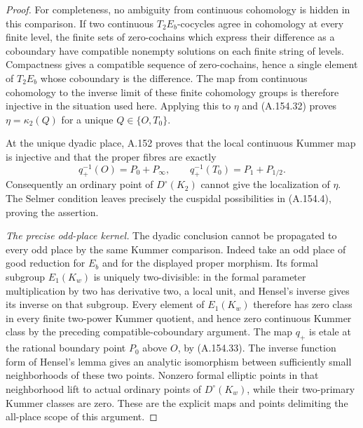 \begin{proof}
For completeness, no ambiguity from continuous
cohomology is hidden in this comparison.  If two
continuous \(T_2E_b\)-cocycles agree in cohomology at
every finite level, the finite sets of zero-cochains
which express their difference as a coboundary have
compatible nonempty solutions on each finite string
of levels.  Compactness gives a compatible sequence
of zero-cochains, hence a single element of \(T_2E_b\)
whose coboundary is the difference.  The map from
continuous cohomology to the inverse limit of these
finite cohomology groups is therefore injective in
the situation used here.  Applying this to \(\eta\)
and (A.154.32) proves
\(\eta=\kappa_2(Q)\) for a unique \(Q\in\{O,T_0\}\).

At the unique dyadic place, A.152 proves that the
local continuous Kummer map is injective and that the
proper fibres are exactly
\[
                  q_+^{-1}(O)=P_0+P_\infty,
             \qquad q_+^{-1}(T_0)=P_1+P_{1/2}.
\tag{A.154.33}
\]
Consequently an ordinary point of \(D^\circ(K_2)\)
cannot give the localization of \(\eta\).
The Selmer condition leaves precisely the cuspidal
possibilities in (A.154.4), proving the assertion.

\emph{The precise odd-place kernel.}
The dyadic conclusion cannot be propagated to every
odd place by the same Kummer comparison.  Indeed take
an odd place of good reduction for \(E_b\) and for the
displayed proper morphism.  Its formal subgroup
\(E_1(K_w)\) is uniquely two-divisible: in the formal
parameter multiplication by two has derivative two,
a local unit, and Hensel's inverse gives its inverse
on that subgroup.  Every element of \(E_1(K_w)\)
therefore has zero class in every finite two-power
Kummer quotient, and hence zero continuous Kummer
class by the preceding compatible-coboundary argument.
The map \(q_+\) is etale at the rational boundary point
\(P_0\) above \(O\), by (A.154.33).  The inverse
function form of Hensel's lemma gives an analytic
isomorphism between sufficiently small neighborhoods
of these two points.  Nonzero formal elliptic points
in that neighborhood lift to actual ordinary points
of \(D^\circ(K_w)\), while their two-primary Kummer
classes are zero.  These are the explicit maps and
points delimiting the all-place scope of this argument.
\end{proof}
